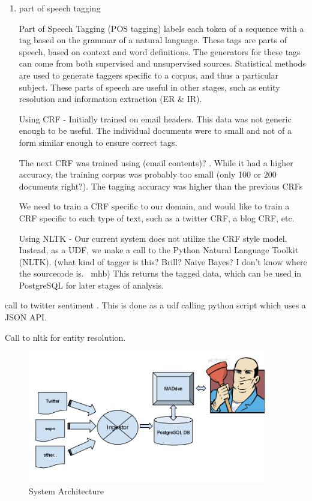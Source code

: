 \documentclass{article}
\begin{document}
\begin{enumerate}
\begin{enumerate}
\begin{enumerate}
    \item part of speech tagging

      Part of Speech Tagging (POS tagging) labels each token of a sequence with a tag based on the grammar of a natural language.
      These tags are parts of speech, based on context and word definitions.
      The generators for these tags can come from both supervised and unsupervised sources.
      Statistical methods are used to generate taggers specific to a corpus, and thus a particular subject.
      These parts of speech are useful in other stages, such as entity resolution and information extraction (ER \& IR).

      Using CRF -
      Initially trained on email headers.
      This data was not generic enough to be useful.
      The individual documents were to small and not of a form similar enough to ensure correct tags.

      The next CRF was trained using (email contents)? .
      While it had a higher accuracy, the training corpus was probably too small (only 100 or 200 documents right?).
      The tagging accuracy was higher than the previous CRFs

      We need to train a CRF specific to our domain,
      and would like to train a CRF specific to each type of text,
      such as a twitter CRF, a blog CRF, etc.

      Using NLTK -
      Our current system does not utilize the CRF style model.
      Instead, as a UDF, we make a call to the Python Natural Language Toolkit (NLTK).
      (what kind of tagger is this? Brill? Naive Bayes? I don't know where the sourcecode is. ~mhb)
      This returns the tagged data, which can be used in PostgreSQL for later stages of analysis.


    \end{enumerate}






    call to twitter sentiment . This is done as a udf calling python script which uses a JSON API.

    Call to nltk for entity resolution.

    \begin{figure}
      \begin{center}
        \includegraphics[width=104mm]{architecture-1.png}
        \caption{System Architecture}
        \label{fig:architecture}
      \end{center}
    \end{figure}


\end{enumerate}
\end{enumerate}
\end{document}

